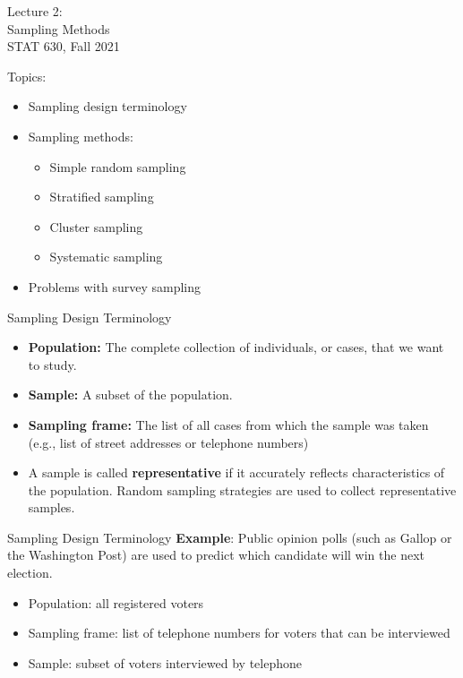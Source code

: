 \documentclass{beamer}
\begin{document}
\begin{frame}
\large
Lecture 2:\\
Sampling Methods\\
STAT 630, Fall 2021
\end{frame}

\begin{frame}
Topics:
\vspace{5pt}
\begin{itemize}
\item Sampling design terminology
\vspace{5pt}
\item Sampling methods:
\begin{itemize}
\item Simple random sampling
\item Stratified sampling
\item Cluster sampling
\item Systematic sampling
\end{itemize}
\vspace{5pt}
\item Problems with survey sampling
\end{itemize}
\end{frame}

\begin{frame}{Sampling Design Terminology}
\begin{itemize}
\item \textbf{Population:}  The complete collection of individuals, or cases, that we want to study.
\vspace{5pt}
\item \textbf{Sample:} A subset of the population.
\vspace{5pt}
\item \textbf{Sampling frame:}  The list of all cases from which the sample was taken (e.g., list of street addresses or telephone numbers)
\vspace{5pt}
\item A sample is called \textbf{representative} if it accurately reflects characteristics of the population.  Random sampling strategies are used to collect representative samples. 
\end{itemize}
\end{frame}

\begin{frame}{Sampling Design Terminology}
\textbf{Example}: Public opinion polls (such as Gallop or the Washington Post) are used to predict which candidate will win the next election.\\
\begin{itemize}
\item Population: all registered voters
\item Sampling frame:  list of telephone numbers for voters that can be interviewed
\item Sample: subset of voters interviewed by telephone     
\end{itemize}
\end{frame}
\end{document}
